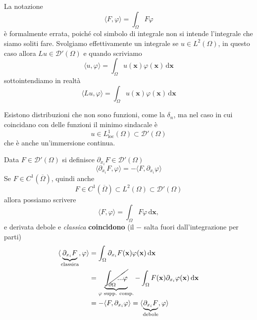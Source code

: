 \documentclass[10pt,a4paper,twoside,openright]{book}
\newcommand{\x}{\mathbf{x}}
\newcommand{\de}{\,\mathrm d}
\newcommand{\dxx}{\de \x}
\begin{document}
\begin{nb}
    La notazione
    \begin{equation*}
        \langle F,\varphi \rangle =\int _{\Omega } F\varphi
    \end{equation*}
    è formalmente errata, poiché col simbolo di integrale non si intende l'integrale che siamo soliti fare. Svolgiamo effettivamente un integrale se $\displaystyle u\in L^{2}(\Omega)$, in questo caso allora $\displaystyle Lu\in \mathcal{D} '(\Omega)$ e quando scriviamo
    \begin{equation*}
        \langle u,\varphi \rangle =\int _{\Omega } u(\x) \varphi (\x) \dxx
    \end{equation*}
    sottointendiamo in realtà
    \begin{equation*}
        \langle Lu,\varphi \rangle =\int _{\Omega } u(\x) \varphi (\x) \dxx
    \end{equation*}
\end{nb}
Esistono distribuzioni che non sono funzioni, come la $\displaystyle \delta _{n}$, ma nel caso in cui coincidano con delle funzioni il minimo sindacale è \
\begin{equation*}
    u\in L^{1}_{\text{loc}}(\Omega) \subset \mathcal{D} '(\Omega)
\end{equation*}
che è anche un'immersione continua.
\begin{definition}
     Data $\displaystyle F\in \mathcal{D}'(\Omega)$ si definisce $\displaystyle \partial _{x_{i}} F\in \mathcal{D} '(\Omega)$
    \begin{equation*}
        \langle \partial _{x_{i}} F,\varphi \rangle =-\langle F,\partial _{x_{i}} \varphi \rangle
    \end{equation*}
    Se $\displaystyle F\in C^{1}(\overline{\Omega })$, quindi anche
    \begin{equation*}
        F\in C^{1}(\overline{\Omega }) \subset L^{2}(\Omega)\mathcal{\subset D} '(\Omega)
    \end{equation*}
    allora possiamo scrivere
    \begin{equation*}
        \langle F,\varphi \rangle =\int _{\Omega } F\varphi \dxx ,
    \end{equation*}
    e derivata debole e \textit{classica} \textbf{coincidono} (il $-$ salta fuori dall'integrazione per parti)
    \begin{align*}
        \langle \underbrace{\partial _{x_{i}} F}_{\text{classica}} ,\varphi \rangle & =\int _{\Omega } \partial _{x_{i}} F(\x) \varphi (\x) \dxx                                                                                          \\
                                                                                    & =\underbrace{\cancel{\int _{\partial \Omega } ...\varphi }}_{\varphi \text{ supp. comp.}} -\int _{\Omega } F(\x) \partial _{x_{i}} \varphi (\x)\dxx \\
                                                                                    & =-\langle F,\partial _{x_{i}} \varphi\rangle =\langle \underbrace{\partial _{x_{i}} F}_{\text{debole}} ,\varphi \rangle
    \end{align*}
\end{definition}
\end{document}
